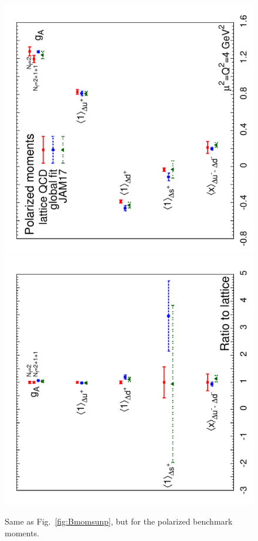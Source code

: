 
\begin{figure}[!t]
\centering
\includegraphics[scale=0.44,angle=270]{plots/polmoms}
\includegraphics[scale=0.44,angle=270]{plots/polmomsratio}\\
\caption{\small Same as Fig.~\ref{fig:Bmomsunp}, but for the polarized
benchmark moments.}
\label{fig:Bmomspol}
\end{figure} 

